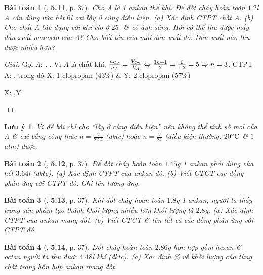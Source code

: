 \documentclass{article}
\numberwithin{equation}{section}
\newtheorem{baitoan}{Bài toán}[section]
\newtheorem{luuy}{Lưu ý}[section]
\begin{document}
\begin{baitoan}[\cite{SBT_Hoa_Hoc_11_co_ban}, \textbf{5.11}, p. 37]
	Cho A là 1 ankan thể khí. Để đốt cháy hoàn toàn $1.2$\emph{l} A cần dùng vừa hết $6$\emph{l} oxi lấy ở cùng điều kiện. (a) Xác định CTPT chất A. (b) Cho chất A tác dụng với khí clo ở $25^\circ$ \& có ánh sáng. Hỏi có thể thu được mấy dẫn xuất monoclo của A? Cho biết tên của mỗi dẫn xuất đó. Dẫn xuất nào thu được nhiều hơn?
\end{baitoan}

\begin{proof}[Giải]
	Gọi $A$: . . Vì $A$ là chất khí, $\frac{n_{\ce{O2}}}{n_A} = \frac{V_{\ce{O2}}}{V_A}\Leftrightarrow\frac{3n + 1}{2} = \frac{6}{1.2} = 5\Rightarrow n = 3$. CTPT A: .  trong đó X: 1-clopropan (43\%) \& Y: 2-clopropan (57\%)
	\begin{center}
		X: ,\hspace{1cm}Y: 
	\end{center}
\end{proof}

\begin{luuy}
	Vì đề bài chỉ cho ``lấy ở cùng điều kiện'' nên không thể tính số mol của A \& oxi bằng công thức $n = \frac{V}{22.4}$ (đktc) hoặc $n = \frac{V}{24}$ (điều kiện thường: $20^\circ{\rm C}$ \& $1$\emph{atm}) được.
\end{luuy}

\begin{baitoan}[\cite{SBT_Hoa_Hoc_11_co_ban}, \textbf{5.12}, p. 37]
	Để đốt cháy hoàn toàn $1.45$\emph{g} 1 ankan phải dùng vừa hết $3.64$\emph{l} \emph{} (đktc). (a) Xác định CTPT của ankan đó. (b) Viết CTCT các đồng phân ứng với CTPT đó. Ghi tên tương ứng.
\end{baitoan}

\begin{baitoan}[\cite{SBT_Hoa_Hoc_11_co_ban}, \textbf{5.13}, p. 37]
	Khi đốt cháy hoàn toàn $1.8$\emph{g} 1 ankan, người ta thấy trong sản phẩm tạo thành khối lượng \emph{} nhiều hơn khối lượng \emph{} là $2.8$\emph{g}. (a) Xác định CTPT của ankan mang đốt. (b) Viết CTCT \& tên tất cả các đồng phân ứng với CTPT đó.
\end{baitoan}

\begin{baitoan}[\cite{SBT_Hoa_Hoc_11_co_ban}, \textbf{5.14}, p. 37]
	Đốt cháy hoàn toàn $2.86$\emph{g} hỗn hợp gồm hexan \& octan người ta thu được $4.48$\emph{l} khí \emph{} (đktc). (a) Xác định \% về khối lượng của từng chất trong hỗn hợp ankan mang đốt.
\end{baitoan}
\end{document}

